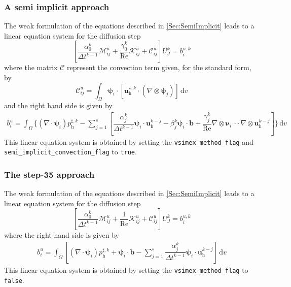 \documentclass[]{scrartcl}
\renewcommand{\d}{\,\mathrm{d}}
\newcommand{\bs}[1]{\boldsymbol{#1}}
\newcommand{\cdott}{\, {\cdot}{\cdot}\,}
\begin{document}
\subsubsection{A semi implicit approach}
The weak formulation of the equations described in \cref{Sec:SemiImplicit} leads to a linear equation system for the diffusion step
\begin{equation*}
	\left[
	\dfrac{\alpha_0^k}{\Delta t^{k-1}} 
	\mathcal{M}^u_{ij}
	+
	\dfrac{\gamma_0^k}{\textrm{Re}}
	\mathcal{K}^u_{ij}
	+
	\mathcal{C}^u_{ij}
	\right]
	U^k_J
	= 
	b^{u, k}_i
\end{equation*}
where the matrix $\mathcal{C}$ represent the convection term given, for the standard form, by
\begin{equation*}
	\mathcal{C}^u_{ij}
	=
	\int_{\Omega}
	\bs{\psi}_i \cdot [\bs{u}^{\star,k}_\textrm{h} \cdot (\nabla \otimes \bs{\psi}_j)]
	\d v
\end{equation*}
and the right hand side is given by
\begin{equation*}
	\begin{split}
		b^u_i = \int_{\Omega}
		\Bigg\lbrace
		(\nabla \cdot \bs{\psi}_i) p^{\sharp, k}_\textrm{h}
		-\sum_{j=1}^{s} 
		\left[
		\dfrac{\alpha_j^k}{\Delta t^{k-1}} \bs{\psi}_i \cdot \bs{u}^{k-j}_\textrm{h}
		-
		\beta_j^k \bs{\psi}_i \cdot \bs{b}
		+
		\dfrac{\gamma_j^k}{\textrm{Re}} \nabla \otimes \bs{\nu}_i \cdott \nabla \otimes \bs{u}^{k-j}_\textrm{h}
		\right]\Bigg\rbrace
		\d v
	\end{split}
\end{equation*}
This linear equation system is obtained by setting the \texttt{vsimex\_method\_flag} and \\ \texttt{semi\_implicit\_convection\_flag} to \texttt{true}.
\subsubsection{The step-35 approach}
The weak formulation of the equations described in \cref{Sec:SemiImplicit} leads to a linear equation system for the diffusion step
\begin{equation*}
	\left[
	\dfrac{\alpha_0^k}{\Delta t^{k-1}} 
	\mathcal{M}^u_{ij}
	+
	\dfrac{1}{\textrm{Re}}
	\mathcal{K}^u_{ij}
	+
	\mathcal{C}^u_{ij}
	\right]
	U^k_J
	= 
	b^{u, k}_i
\end{equation*}
where the right hand side is given by
\begin{equation*}
	\begin{split}
		b^u_i = \int_{\Omega}
		\left[
		(\nabla \cdot \bs{\psi}_i) p^{\sharp, k}_\textrm{h}
		+ 
		\bs{\psi}_i \cdot \bs{b}
		-\sum_{j=1}^{s} 
		\dfrac{\alpha_j^k}{\Delta t^{k-1}} \bs{\psi}_i \cdot \bs{u}^{k-j}_\textrm{h}
		\right]
		\d v
	\end{split}
\end{equation*}
This linear equation system is obtained by setting the \texttt{vsimex\_method\_flag} to \texttt{false}.
\end{document}
